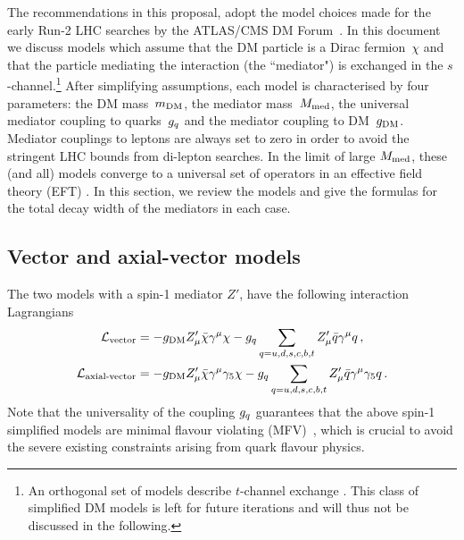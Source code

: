 The recommendations in this proposal, adopt the model choices made for the early Run-2 LHC searches by the ATLAS/CMS DM Forum~\cite{Abercrombie:2015wmb}. 
In this document we discuss
models which
assume that the DM particle is a Dirac fermion~$\chi$ and that the particle mediating the interaction (the ``mediator") is exchanged in the $s$-channel.\footnote{An orthogonal set of models describe $t$-channel exchange \cite{Chang:2013oia,An:2013xka,Bai:2013iqa,DiFranzo:2013vra}. This class of simplified DM models is left for future iterations and will thus not be discussed in the following.}
After simplifying assumptions,
each model is characterised by four parameters: the DM mass~$m_{\rm{DM}}$, the mediator mass~$M_{\rm{med}}$, the universal mediator coupling to quarks~$g_q$  and the mediator coupling to DM~$g_{\rm{DM}}$. Mediator couplings to leptons are always set to zero in order to avoid the stringent LHC bounds from 
di-lepton searches.  
In the limit of large $M_{\rm{med}}$, these (and all) models converge to a universal set of operators in an effective field theory (EFT)
\cite{Beltran:2010ww,Goodman:2010yf,Bai:2010hh,Goodman:2010ku,Rajaraman:2011wf,Fox:2011pm}.
In this section, we review the models and give the formulas for the total decay width of the mediators in each case. 

\subsection{Vector and axial-vector models}

The two models with a spin-1 mediator $Z'$, have the following interaction Lagrangians
\begin{align}
\label{eq:AV1} 
\mathcal{L}_{\text{vector}}&=- g_{\rm{DM}} Z'_{\mu} \bar{\chi}\gamma^{\mu}\chi -   g_q  \sum_{q=u,d,s,c,b,t} Z'_{\mu} \bar{q}\gamma^{\mu}q \,, \\
\label{eq:AV2} 
\mathcal{L}_{\text{axial-vector}}&=- g_{\rm{DM}} Z'_{\mu} \bar{\chi}\gamma^{\mu}\gamma_5\chi - g_q \sum_{q=u,d,s,c,b,t} Z'_{\mu} \bar{q}\gamma^{\mu}\gamma_5q\,.
\end{align}
Note that the universality of the coupling $g_q$ guarantees that the above spin-1 simplified models are minimal flavour violating (MFV)~\cite{D'Ambrosio:2002ex}, which is crucial to avoid the severe existing constraints arising from quark flavour physics. 

